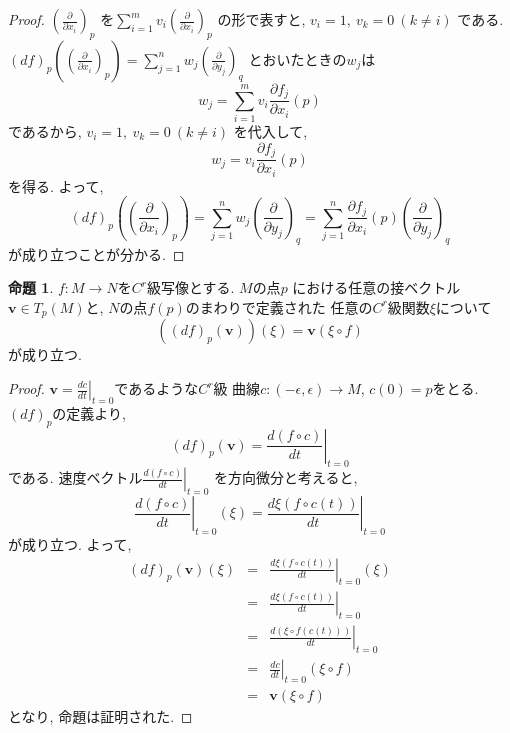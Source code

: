 \documentclass[a4j,12pt]{jarticle}
\theoremstyle{definition}
\newtheorem{proposition}[theorem]{命題}
\begin{document}
\begin{proof}
    $\left(\frac{\partial}{\partial x_i}\right)_p$
    を$\sum_{i=1}^{m}v_i\left(\frac
    {\partial}{\partial x_i}\right)_p$
    の形で表すと, $v_i=1,\ v_k=0\ (k\neq i)$
    である. 
    $(df)_p\left( \left(
        \frac{\partial}{\partial x_i}
    \right)_p\right)=
    \sum_{j=1}^{n}w_j\left(
        \frac{\partial}{\partial y_j}
    \right)_q$
    とおいたときの$w_j$は
    $$w_j=\sum_{i=1}^{m}v_i \frac{\partial f_j}
    {\partial x_i}(p)$$
    であるから, $v_i=1,\ v_k=0\ (k\neq i)$
    を代入して, 
    $$w_j=v_i \frac{\partial f_j}
    {\partial x_i}(p)$$
    を得る. よって, 
    $$(df)_p\left( \left(
        \frac{\partial}{\partial x_i}
    \right)_p\right)=
    \sum_{j=1}^{n}w_j\left(
        \frac{\partial}{\partial y_j}
    \right)_q=
    \sum_{j=1}^{n}\frac{\partial f_j}
    {\partial x_i}(p)\left(
        \frac{\partial}{\partial y_j}
    \right)_q$$
    が成り立つことが分かる. 
\end{proof}
\begin{proposition}
    $f:M\to N$を$C^r$級写像とする. $M$の点$p$
    における任意の接ベクトル$\boldsymbol{v}
    \in T_p(M)$と, $N$の点$f(p)$のまわりで定義された
    任意の$C^r$級関数$\xi$について
    $$((df)_p(\boldsymbol{v}))(\xi)=
    \boldsymbol{v}(\xi \circ f)$$
    が成り立つ. 
\end{proposition}
\begin{proof}
    $\boldsymbol{v}=\left .\frac{dc}{dt}
    \right|_{t=0}$であるような$C^r$級
    曲線$c:(-\epsilon, \epsilon)\to M$, 
    $c(0)=p$をとる. $(df)_p$の定義より, 
    $$(df)_p(\boldsymbol{v})=
    \left .\frac{d(f\circ c)}{dt}\right|_{t=0}$$
    である. 
    速度ベクトル$\left .\frac{d(f\circ c)}{dt}\right|_{t=0}$
    を方向微分と考えると, 
    $$\left .\frac{d(f\circ c)}{dt}\right|_{t=0}
    (\xi)=
    \left .\frac{d\xi(f\circ c(t))}
    {dt}\right|_{t=0}$$
    が成り立つ. よって, 
    \begin{eqnarray*}
        (df)_p(\boldsymbol{v})(\xi)&=&
        \left .\frac{d\xi(f\circ c(t))}
        {dt}\right|_{t=0}(\xi)\\
        &=&\left .\frac{d\xi(f\circ c(t))}
        {dt}\right|_{t=0}\\
        &=&\left .\frac{d(\xi\circ f(c(t)))}
        {dt}\right|_{t=0}\\
        &=&
        \left .\frac{dc}{dt}\right|_{t=0}(\xi 
        \circ f)\\
        &=&\boldsymbol{v}(\xi\circ f)
    \end{eqnarray*}
    となり, 命題は証明された. 
\end{proof}
\end{document}
